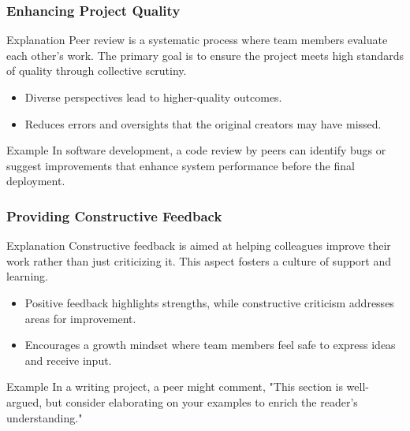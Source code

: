 \documentclass{beamer}
\begin{document}
\begin{frame}[fragile]
    \frametitle{Enhancing Project Quality}
    \begin{block}{Explanation}
        Peer review is a systematic process where team members evaluate each other's work. The primary goal is to ensure the project meets high standards of quality through collective scrutiny.
    \end{block}
    \begin{itemize}
        \item Diverse perspectives lead to higher-quality outcomes.
        \item Reduces errors and oversights that the original creators may have missed.
    \end{itemize}
    \begin{block}{Example}
        In software development, a code review by peers can identify bugs or suggest improvements that enhance system performance before the final deployment.
    \end{block}
\end{frame}

\begin{frame}[fragile]
    \frametitle{Providing Constructive Feedback}
    \begin{block}{Explanation}
        Constructive feedback is aimed at helping colleagues improve their work rather than just criticizing it. This aspect fosters a culture of support and learning.
    \end{block}
    \begin{itemize}
        \item Positive feedback highlights strengths, while constructive criticism addresses areas for improvement.
        \item Encourages a growth mindset where team members feel safe to express ideas and receive input.
    \end{itemize}
    \begin{block}{Example}
        In a writing project, a peer might comment, "This section is well-argued, but consider elaborating on your examples to enrich the reader's understanding."
    \end{block}
\end{frame}
\end{document}
